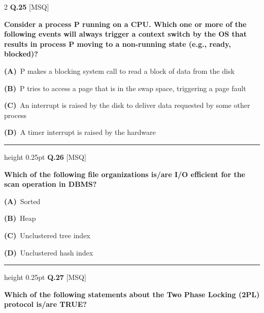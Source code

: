 \documentclass[a4paper,10pt,twoside]{article}
\begin{document}
\begin{multicols}{2}
\noindent\textbf{Q.25} \hfill {\footnotesize\textsf{[MSQ]}}
\par\vspace{2pt}
{\bfseries Consider a process P running on a CPU. Which one or more of the following events will always trigger a context switch by the OS that results in process P moving to a non-running state (e.g., ready, blocked)? \par}
\par\vspace{2pt}\noindent
\textbf{(A)}~P makes a blocking system call to read a block of data from the disk\par\vspace{2pt}\noindent
\textbf{(B)}~P tries to access a page that is in the swap space, triggering a page fault\par\vspace{2pt}\noindent
\textbf{(C)}~An interrupt is raised by the disk to deliver data requested by some other process\par\vspace{2pt}\noindent
\textbf{(D)}~A timer interrupt is raised by the hardware
\par\vspace{6pt}\hrule height 0.25pt\vspace{6pt}
\noindent\textbf{Q.26} \hfill {\footnotesize\textsf{[MSQ]}}
\par\vspace{2pt}
{\bfseries Which of the following file organizations is/are I/O efficient for the scan operation in DBMS? \par}
\par\vspace{2pt}\noindent
\textbf{(A)}~Sorted\par\vspace{2pt}\noindent
\textbf{(B)}~Heap\par\vspace{2pt}\noindent
\textbf{(C)}~Unclustered tree index\par\vspace{2pt}\noindent
\textbf{(D)}~Unclustered hash index
\par\vspace{6pt}\hrule height 0.25pt\vspace{6pt}
\noindent\textbf{Q.27} \hfill {\footnotesize\textsf{[MSQ]}}
\par\vspace{2pt}
{\bfseries Which of the following statements about the Two Phase Locking (2PL) protocol is/are TRUE? \par}

\end{multicols}
\end{document}
